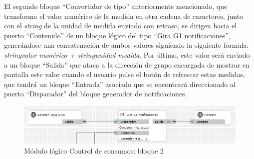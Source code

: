 El segundo bloque “Convertidor de tipo” anteriormente mencionado, que transforma el valor numérico de la medida en otra cadena de caracteres,  junto con el \textit{string} de la unidad de medida enviado con retraso, se dirigen hacia el puerto “Contenido” de un bloque lógico del tipo “Gira G1 notificaciones”, generándose una concatenación de ambos valores siguiendo la siguiente formula: \textit{string{valor numérico} +  string{unidad medida}}. Por último, este valor será enviado a un bloque “Salida” que ataca a la dirección de grupo encargada de mostrar en pantalla este valor cuando el usuario pulse el botón de refrescar estas medidas, que tendrá un bloque “Entrada” asociado que se encontrará direccionado al puerto “Disparador” del bloque generador de notificaciones.
\begin{figure}[H]
\centering
\includegraphics[width=1\textwidth]{figures/log_consu_b2.png}   
\caption{Módulo lógico Control de consumos: bloque 2}
\label{fig:log_consu_b2}
\end{figure}


